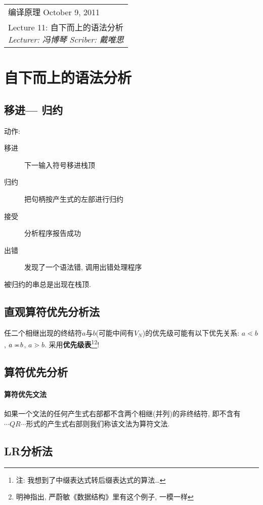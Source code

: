 \def\lecture{11}
\clearpage \noindent\begin{tabularx}{\linewidth}{|X|}
\hline \vskip -2mm
{\sf 编译原理} \hfill October 9, 2011 \\
{\centering \sf \large Lecture \lecture:
自下而上的语法分析 \\ }
\textsl{Lecturer: 冯博琴 \hfill Scriber: 戴唯思}\\ \hline
\end{tabularx}
\setcounter{section}{0}
\renewcommand{\thepage}{\lecture -\arabic{page}}

\newcommand\eqdot{=\hskip -.8em\cdot\ }

\section{自下而上的语法分析}

    \subsection{移进--- 归约}

        动作:
        \begin{description}
            \item[移进] 下一输入符号移进栈顶
            \item[归约] 把句柄按产生式的左部进行归约
            \item[接受] 分析程序报告成功
            \item[出错] 发现了一个语法错, 调用出错处理程序
        \end{description}

        被归约的串总是出现在栈顶.

    \subsection{直观算符优先分析法}

        任二个相继出现的终结符$a$与$b$(可能中间有$V_N$)的优先级可能有以下优先关系: $a\lessdot b$, $a\eqdot b$, $a\gtrdot b$. 采用\textbf{优先级表}\footnote{注: 我想到了中缀表达式转后缀表达式的算法\ldots}\footnote{明神指出, 严蔚敏《数据结构》里有这个例子, 一模一样}!

    \subsection{算符优先分析}

        \paragraph{算符优先文法}

            如果一个文法的任何产生式右部都不含两个相继(并列)的非终结符, 即不含有$\cdots QR\cdots$形式的产生式右部则我们称该文法为\textsf{算符文法}.


    \subsection{LR分析法}
